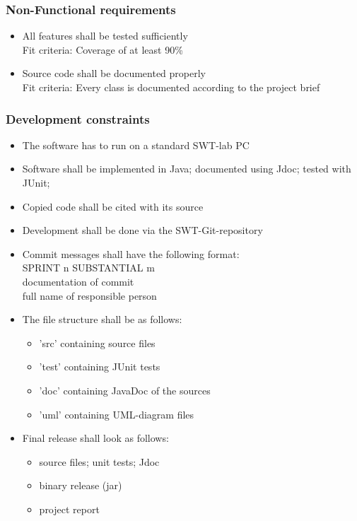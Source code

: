 \subsubsection{Non-Functional requirements}
\begin{itemize}
	\item All features shall be tested sufficiently\\
	Fit criteria: Coverage of at least 90\%
	\item Source code shall be documented properly\\
	Fit criteria: Every class is documented according to the project brief
\end{itemize}

\subsubsection{Development constraints}
\begin{itemize}
	\item The software has to run on a standard SWT-lab PC
	\item Software shall be implemented in Java; documented using Jdoc; tested with JUnit;
	\item Copied code shall be cited with its source
	\item Development shall be done via the SWT-Git-repository
	\item Commit messages shall have the following format: \\
	SPRINT n SUBSTANTIAL m \\
	documentation of commit \\
	full name of responsible person
	\item The file structure shall be as follows:
	\begin{itemize}
		\item 'src' containing source files
		\item 'test' containing JUnit tests
		\item 'doc' containing JavaDoc of the sources
		\item 'uml' containing UML-diagram files
	\end{itemize}
	\item Final release shall look as follows:
	\begin{itemize}
		\item source files; unit tests; Jdoc
		\item binary release (jar)
		\item project report
	\end{itemize}
	
\end{itemize}

